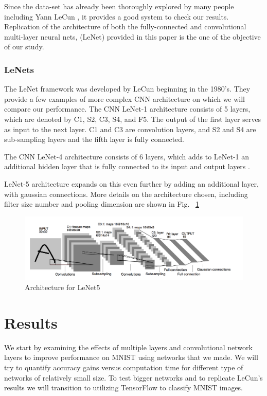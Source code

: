 \documentclass[12pt, twocolumn]{article}
\begin{document}
Since the data-set has already been thoroughly explored  by many people including Yann LeCun \cite{LeCun1998}, it provides a good system to check our results.  Replication of the architecture of both the fully-connected and convolutional multi-layer neural nets, (LeNet) provided in this paper is the one of the objective of our study. 

\subsubsection{LeNets}
The LeNet framework was developed by LeCun beginning in the 1980's. They provide a few examples of more complex CNN architecture on which we will compare our performance. 
The CNN LeNet-1 architecture consists of 5 layers, which are denoted by C1, S2, C3, S4, and F5.  The output of the first layer serves as
input to the next layer. C1 and C3 are convolution layers, and S2 and S4 are sub-sampling layers and the fifth layer is fully connected. \cite{LeCun89}

The CNN LeNet-4 architecture consists of 6 layers, which adds to LeNet-1 an additional hidden layer that is fully connected to its  input and output layers  \cite{LeCun95}.

LeNet-5 architecture expands on this even further by adding an additional layer, with gaussian connections. More details on the architecture chosen, including filter size number and pooling dimension are shown in Fig. ~\ref{fig:LeNet5}

 \begin{figure}
\includegraphics[scale=.6]{LeNet5.png}
\caption{Architecture for LeNet5 \cite{LeCun1998}}
\label{fig:LeNet5}
\end{figure}



\section{Results}
We start by examining the effects of multiple layers and convolutional network layers to improve performance on MNIST using networks that we made. We will try to quantify accuracy gains versus computation time for different type of networks of relatively small size. To test bigger networks and to replicate LeCun's results we will transition to utilizing TensorFlow to classify MNIST images. 
\end{document}
